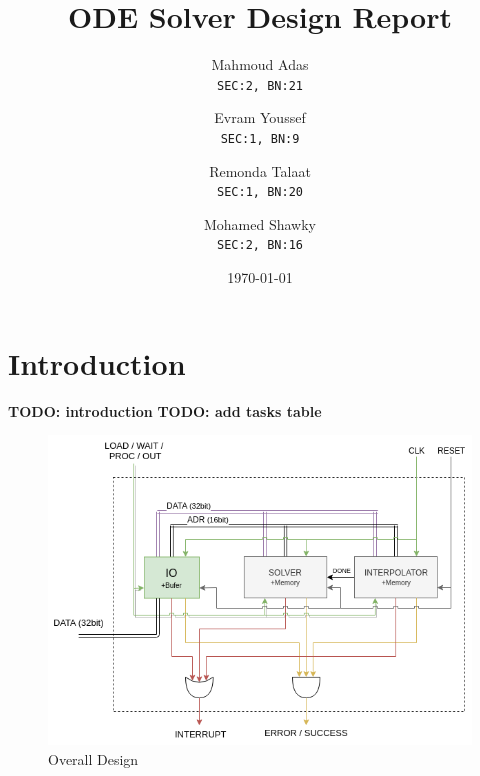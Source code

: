 \documentclass[12pt]{report}
\title{ODE Solver Design Report}
\author{
  Mahmoud Adas\\
  \small\texttt{SEC:2, BN:21}
  \and
  Evram Youssef\\
  \small\texttt{SEC:1, BN:9}
  \and
  Remonda Talaat\\
  \small\texttt{SEC:1, BN:20}
  \and
  Mohamed Shawky\\
  \small\texttt{SEC:2, BN:16}
}
\date{\today}
\begin{document}
\maketitle
\tableofcontents

\part{Introduction}
\textbf{TODO: introduction}
\textbf{TODO: add tasks table}

\begin{center}
    \begin{figure}[hp]
        \centering
        \includegraphics[width=\textwidth]{d1}
        \caption{Overall Design}
        \label{fig:overall}
    \end{figure}
\end{center}
\end{document}
